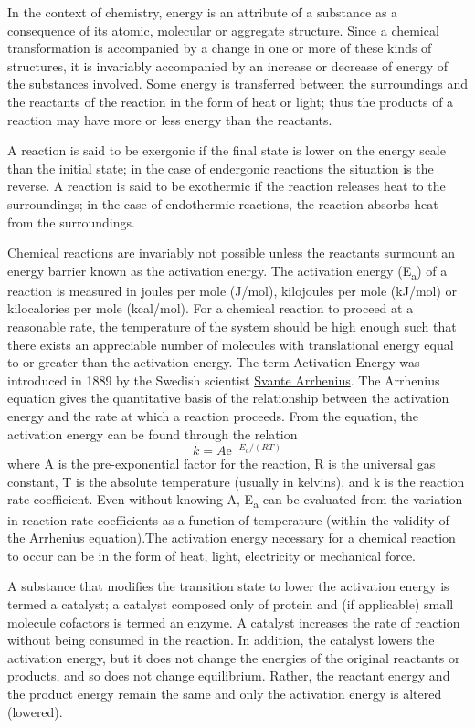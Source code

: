 In the context of chemistry, energy is an attribute of a substance as a consequence of its atomic, molecular or aggregate structure. Since a chemical transformation is accompanied by a change in one or more of these kinds of structures, it is invariably accompanied by an increase or decrease of energy of the substances involved. Some energy is transferred between the surroundings and the reactants of the reaction in the form of heat or light; thus the products of a reaction may have more or less energy than the reactants.

A reaction is said to be exergonic if the final state is lower on the energy scale than the initial state; in the case of endergonic reactions the situation is the reverse. A reaction is said to be exothermic if the reaction releases heat to the surroundings; in the case of endothermic reactions, the reaction absorbs heat from the surroundings.

Chemical reactions are invariably not possible unless the reactants surmount an energy barrier known as the activation energy. The activation energy (E\textsubscript{a}) of a reaction is measured in joules per mole (J/mol), kilojoules per mole (kJ/mol) or kilocalories per mole (kcal/mol). For a chemical reaction to proceed at a reasonable rate, the temperature of the system should be high enough such that there exists an appreciable number of molecules with translational energy equal to or greater than the activation energy. The term Activation Energy was introduced in 1889 by the Swedish scientist \href{https://en.wikipedia.org/wiki/Svante_Arrhenius}{Svante Arrhenius}. The Arrhenius equation gives the quantitative basis of the relationship between the activation energy and the rate at which a reaction proceeds. From the equation, the activation energy can be found through the relation
\[ k=A\mathrm{e}^{-E_a/(RT)} \]
where A is the pre-exponential factor for the reaction, R is the universal gas constant, T is the absolute temperature (usually in kelvins), and k is the reaction rate coefficient. Even without knowing A, E\textsubscript{a} can be evaluated from the variation in reaction rate coefficients as a function of temperature (within the validity of the Arrhenius equation).The activation energy necessary for a chemical reaction to occur can be in the form of heat, light, electricity or mechanical force.

A substance that modifies the transition state to lower the activation energy is termed a catalyst; a catalyst composed only of protein and (if applicable) small molecule cofactors is termed an enzyme. A catalyst increases the rate of reaction without being consumed in the reaction. In addition, the catalyst lowers the activation energy, but it does not change the energies of the original reactants or products, and so does not change equilibrium. Rather, the reactant energy and the product energy remain the same and only the activation energy is altered (lowered).

